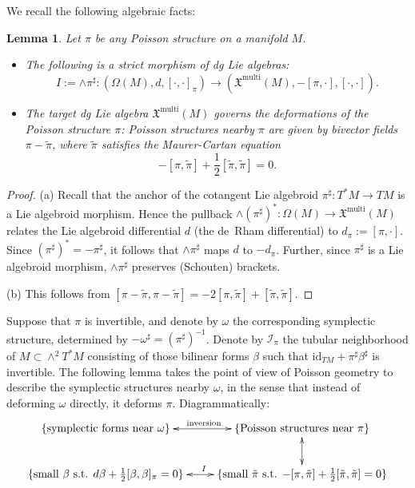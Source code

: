 \documentclass[11pt,thmsa]{amsart}
\newtheorem{lemma}[theorem]{Lemma}
\theoremstyle{definition}
\begin{document}
 We recall the following algebraic facts:
\begin{lemma}\label{lem:strict} Let $\pi$ be any Poisson structure on a manifold $M$.
\begin{itemize}
\item [(a)]
The following is a strict morphism of dg Lie algebras:
$$I:=\wedge\pi^{\sharp}\colon (\Omega(M),d,[\cdot,\cdot]_{\pi})\to (\mathfrak{X}^\mathrm{multi}(M),-[\pi,\cdot],[\cdot,\cdot]).$$
\item [(b)]The target dg Lie algebra $\mathfrak{X}^\mathrm{multi}(M)$  governs the deformations of the Poisson structure $\pi$:  Poisson structures nearby $\pi$ are given by bivector fields $\pi-\tilde{\pi}$, where $\tilde{\pi}$ satisfies the Maurer-Cartan equation
$$ -[\pi,\tilde{\pi}] + \frac{1}{2}[\tilde{\pi},\tilde{\pi}]=0.$$
\end{itemize}
\end{lemma}
\begin{proof}
(a) Recall that the anchor of the cotangent Lie algebroid $\pi^{\sharp}\colon T^*M\to TM$ is a Lie algebroid morphism. Hence the pullback $\wedge(\pi^{\sharp})^*\colon \Omega(M)\to \mathfrak{X}^{\mathrm{multi}}(M)$ relates the Lie algebroid differential $d$ (the de~Rham differential) to $d_{\pi}:=[\pi,\cdot]$. Since $(\pi^{\sharp})^*=-\pi^{\sharp}$, it follows that $\wedge\pi^{\sharp}$ maps   $d$  to $-d_{\pi}$. Further, since  $\pi^{\sharp}$ is a Lie algebroid morphism, $\wedge\pi^{\sharp}$ preserves (Schouten) brackets.

(b) This follows from $[\pi-\tilde{\pi},\pi-\tilde{\pi}]= -2[\pi, \tilde{\pi}]+[\tilde{\pi},\tilde{\pi}]$.
\end{proof}

 


 Suppose that $\pi$ is invertible, and denote by $\omega$ the corresponding symplectic structure, determined by $-\omega^{\sharp}=(\pi^{\sharp})^{-1}$. Denote by $\mathcal{I}_\pi$ the tubular neighborhood of $M\subset \wedge^2 T^*M$ consisting of those bilinear forms $\beta$ such that $\mathrm{id}_{TM}+ \pi^\sharp\beta^\sharp$
is invertible. The following lemma takes the point of view of Poisson geometry to describe the symplectic structures nearby $\omega$, in the sense that instead of deforming $\omega$ directly, it deforms $\pi$. Diagrammatically:
$$
\xymatrix{
\{\text{symplectic forms near $\omega$}\} \ar@{<->}[r]^{\text{inversion}}& \{\text{Poisson structures near $\pi$}\} \ar@{<->}[d]\\
\{\text{small $\beta$ s.t. $ d\beta +\frac{1}{2}[\beta,\beta]_\pi=0$}\}
\ar@{<->}[r]^{I}&
\{\text{small $\tilde{\pi}$ s.t. $-[\pi, \tilde{\pi}]+\frac{1}{2}[\tilde{\pi},\tilde{\pi}]
=0$}\}
 \\
}
$$
\end{document}
